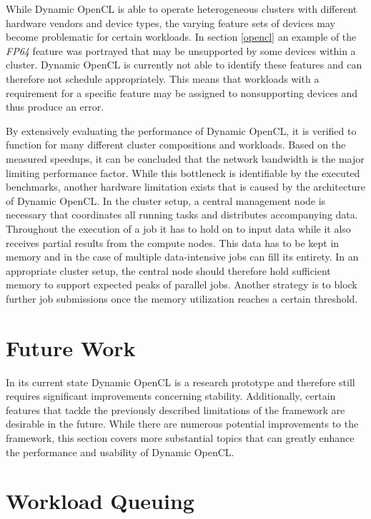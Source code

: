While Dynamic OpenCL is able to operate heterogeneous clusters with different hardware vendors and device types, the varying feature sets of devices may become problematic for certain workloads. In section \ref{opencl} an example of the \textit{FP64} feature was portrayed that may be unsupported by some devices within a cluster. Dynamic OpenCL is currently not able to identify these features and can therefore not schedule appropriately. This means that workloads with a requirement for a specific feature may be assigned to nonsupporting devices and thus produce an error.

By extensively evaluating the performance of Dynamic OpenCL, it is verified to function for many different cluster compositions and workloads. Based on the measured speedups, it can be concluded that the network bandwidth is the major limiting performance factor. While this bottleneck is identifiable by the executed benchmarks, another hardware limitation exists that is caused by the architecture of Dynamic OpenCL. In the cluster setup, a central management node is necessary that coordinates all running tasks and distributes accompanying data. Throughout the execution of a job it has to hold on to input data while it also receives partial results from the compute nodes. This data has to be kept in memory and in the case of multiple data-intensive jobs can fill its entirety. In an appropriate cluster setup, the central node should therefore hold sufficient memory to support expected peaks of parallel jobs. Another strategy is to block further job submissions once the memory utilization reaches a certain threshold.

\section{Future Work}
\label{future_work}
In its current state Dynamic OpenCL is a research prototype and therefore still requires significant improvements concerning stability. Additionally, certain features that tackle the previously described limitations of the framework are desirable in the future. While there are numerous potential improvements to the framework, this section covers more substantial topics that can greatly enhance the performance and usability of Dynamic OpenCL.

\section*{Workload Queuing}

